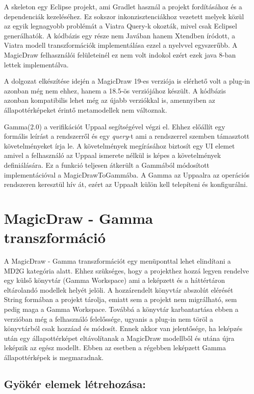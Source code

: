 A skeleton egy Eclipse projekt, ami Gradlet használ a projekt fordításához és a dependenciák kezeléséhez. Ez sokszor inkonzisztenciákhoz vezetett melyek közül az egyik legnagyobb problémát a Viatra Query-k okozták, mivel csak Eclipsel generálhatók. A kódbázis egy része nem Javában hanem Xtendben íródott, a Viatra modell transzformációk implementálása ezzel a nyelvvel egyszerűbb. A MagicDraw felhasználói felületeinél ez nem volt indokol ezért ezek java 8-ban lettek implementálva.

A dolgozat elkészítése idején a MagicDraw 19-es verziója is elérhető volt a plug-in azonban még nem ehhez, hanem a 18.5-ös verziójához készült. A kódbázis azonban kompatibilis lehet még az újabb verziókkal is, amennyiben az állapottérképeket érintő metamodellek nem változnak.

Gamma(2.0) a verifikációt Uppaal segítségével végzi el. Ehhez előállít egy formális leírást a rendszerről és egy \emph{query}-t ami a rendszerrel szemben támasztott követelményeket írja le. A követelmények megírásához biztosít egy UI elemet amivel a felhasználó az Uppaal ismerete nélkül is képes a követelmények definiálására. Ez a funkció teljesen átkerült a Gammából módosított implementációval a MagicDrawToGammába. A Gamma az Uppaalra az operációs rendszeren keresztül hív át, ezért az Uppaalt külön kell telepíteni és konfigurálni.

\section{MagicDraw - Gamma transzformáció}

A MagicDraw - Gamma transzformációt egy menüponttal lehet elindítani a MD2G kategória alatt. Ehhez szükséges, hogy a projekthez hozzá legyen rendelve egy külső könyvtár (Gamma Workspace) ami a leképzett és a háttértáron eltárolandó modellek helyét jelöli. A hozzárendelt könyvtár abszolút elérését String formában a projekt tárolja, emiatt sem a projekt nem migrálható, sem pedig maga a Gamma Workspace. Továbbá a könyvtár karbantartása ebben a verzióban még a felhasználó felelőssége, ugyanis a plug-in nem töröl a könyvtárból csak hozzáad és módosít. Ennek akkor van jelentősége, ha leképzés után egy állapottérképet eltávolítanak a MagicDraw modellből és utána újra leképzik az egész modellt. Ebben az esetben a régebben leképzett Gamma állapottérképek is megmaradnak.

\subsection{Gyökér elemek létrehozása:}

